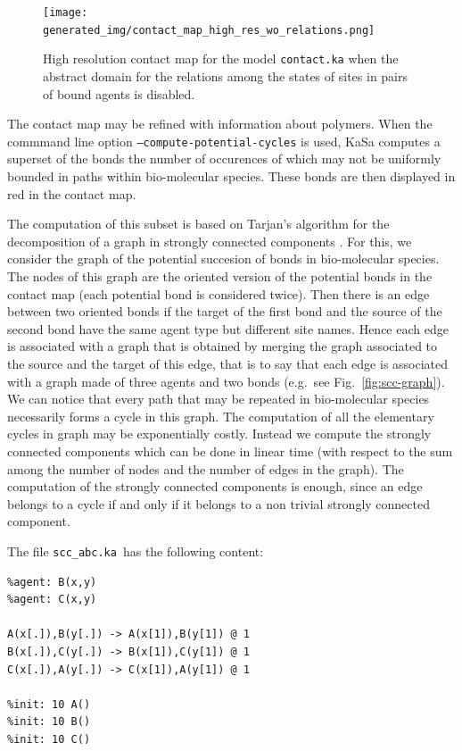 \documentclass[11pt]{book}
\def\KaSa{\textsf{KaSa}}
\begin{document}
\begin{figure}[htbp]
\centering
\texttt{[image: generated\_img/contact\_map\_high\_res\_wo\_relations.png]}
\caption{High resolution contact map for the model \texttt{contact.ka} when the abstract domain for the relations among the states of sites in pairs of bound agents is disabled.}
\label{fig:cm-high-res-wo-rel}
\end{figure}

The contact map may be refined with information about polymers.
When the commmand line option \texttt{--compute-potential-cycles} is used, {\KaSa} computes a superset of the bonds the number of occurences of which may not be uniformly bounded in paths within bio-molecular species. These bonds are then displayed in red in the contact map.

The computation of this subset is based on Tarjan's algorithm for the decomposition of a graph in strongly connected components \cite{Tarjan}. For this, we consider the graph of the potential succesion of bonds in bio-molecular species. The nodes of this graph are the oriented version of the potential bonds in the contact map (each potential bond is considered twice). Then there is an edge between two oriented bonds if the target of the first bond and the source of the second bond have the same agent type but different site names. Hence each edge is associated with a graph that is obtained by merging the graph associated to the source and the target of this edge, that is to say that each edge is associated with a graph made of three agents and two bonds (e.g.~see Fig.~\ref{fig:scc-graph}). We can notice that every path that may be repeated in bio-molecular species necessarily forms a cycle in this graph. The computation of all the elementary cycles in graph may be exponentially costly. Instead we compute the strongly connected components which can be done in linear time (with respect to the sum among the number of nodes and the number of edges in the graph). The computation of the strongly connected components is enough, since an edge belongs to a cycle if and only if it belongs to a non trivial strongly connected component.

The file \texttt{scc\_abc.ka} has the following content:
\begin{lstlisting}[language=kappa]
%agent: A(x,y)
%agent: B(x,y)
%agent: C(x,y)

A(x[.]),B(y[.]) -> A(x[1]),B(y[1]) @ 1
B(x[.]),C(y[.]) -> B(x[1]),C(y[1]) @ 1
C(x[.]),A(y[.]) -> C(x[1]),A(y[1]) @ 1

%init: 10 A()
%init: 10 B()
%init: 10 C()
\end{lstlisting}
\end{document}
